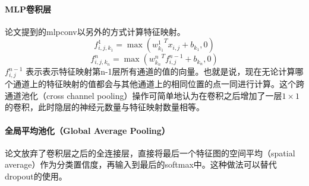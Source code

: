 \documentclass[10pt,letterpaper]{article}
\begin{document}
\paragraph{MLP卷积层} 论文提到的mlpconv以另外的方式计算特征映射。
\begin{equation}
	f^1_{i,j,k_1} = \max ({w_{k_1}^1}^Tx_{i,j} + b_{k_1}, 0)
\end{equation}
\begin{equation}
	 f^n_{i,j,k_n} = \max ({w_{k_n}^n}^Tf_{i,j}^{n-1} + b_{k_n}, 0)
\end{equation}
$f_{i,j}^{n-1}$ 表示表示特征映射第n-1层所有通道的值的向量。也就是说，现在无论计算哪个通道上的特征映射的值都会与其他通道上的相同位置的点一同进行计算。这个跨通道池化（cross channel pooling）操作可简单地认为在卷积之后增加了一层$1 \times 1$的卷积，此时隐层的神经元数量与特征映射数量相等。
\paragraph{全局平均池化（Global Average Pooling）} 论文放弃了卷积层之后的全连接层，直接将最后一个特征图的空间平均（spatial average）作为分类置信度，再输入到最后的softmax中。这种做法可以替代dropout的使用。























\end{document}
